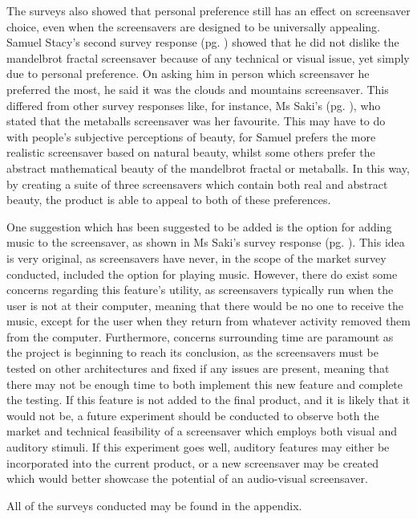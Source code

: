 \documentclass[10pt, openany]{book}
\begin{document}
The surveys also showed that personal preference still has an effect on screensaver choice, even when the screensavers are designed to be universally appealing. Samuel Stacy's second survey response (pg. \pageref{app:survey-sam-2}) showed that he did not dislike the mandelbrot fractal screensaver because of any technical or visual issue, yet simply due to personal preference. On asking him in person which screensaver he preferred the most, he said it was the clouds and mountains screensaver. This differed from other survey responses like, for instance, Ms Saki's (pg. \pageref{app:survey-aartee}), who stated that the metaballs screensaver was her favourite. This may have to do with people's subjective perceptions of beauty, for Samuel prefers the more realistic screensaver based on natural beauty, whilst some others prefer the abstract mathematical beauty of the mandelbrot fractal or metaballs. In this way, by creating a suite of three screensavers which contain both real and abstract beauty, the product is able to appeal to both of these preferences.

One suggestion which has been suggested to be added is the option for adding music to the screensaver, as shown in Ms Saki's survey response (pg. \pageref{app:survey-aartee}). This idea is very original, as screensavers have never, in the scope of the market survey conducted, included the option for playing music. However, there do exist some concerns regarding this feature's utility, as screensavers typically run when the user is not at their computer, meaning that there would be no one to receive the music, except for the user when they return from whatever activity removed them from the computer. Furthermore, concerns surrounding time are paramount as the project is beginning to reach its conclusion, as the screensavers must be tested on other architectures and fixed if any issues are present, meaning that there may not be enough time to both implement this new feature and complete the testing. If this feature is not added to the final product, and it is likely that it would not be, a future experiment should be conducted to observe both the market and technical feasibility of a screensaver which employs both visual and auditory stimuli. If this experiment goes well, auditory features may either be incorporated into the current product, or a new screensaver may be created which would better showcase the potential of an audio-visual screensaver.

All of the surveys conducted may be found in the appendix.
\end{document}
